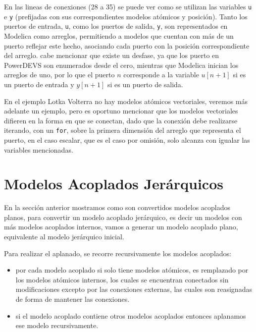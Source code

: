         En las lineas de conexiones (28 a 35) se puede ver como se utilizan las variables \texttt{u} e \texttt{y} (prefijadas con sus correspondientes modelos
        atómicos y posición). Tanto los puertos de entrada, \texttt{u}, como los puertos de salida, \texttt{y}, son representados en Modelica como arreglos,
        permitiendo a modelos que cuentan con más de un puerto reflejar este hecho, asociando cada puerto con la posición correspondiente del arreglo. 
        cabe mencionar que existe un desfase, ya que los puerto en PowerDEVS son enumerados desde el cero, mientras que Modelica inician los arreglos de uno, por lo
        que el puerto $n$ corresponde a la variable $u[n+1]$ si es un puerto de entrada y $y[n+1]$ si es un puerto de salida.

        En el ejemplo Lotka Volterra no hay modelos atómicos vectoriales, veremos más adelante un ejemplo, pero es oportuno mencionar que los modelos
        vectoriales difieren en la forma en que se conectan, dado que la conexión debe realizarse iterando, con un \texttt{for}, sobre la primera dimensión del 
        arreglo que representa el puerto, en el caso escalar, que es el caso por omisión, solo alcanza con igualar las variables mencionadas.


\section{Modelos Acoplados Jerárquicos} \label{aplanado}
        En la sección anterior mostramos como son convertidos modelos acoplados planos, para convertir un modelo acoplado jerárquico, es decir un modelos con más 
        modelos acoplados internos, vamos a generar un modelo acoplado plano, equivalente al modelo jerárquico inicial.

        Para realizar el aplanado, se recorre recursivamente los modelos acoplados:

        \begin{itemize}
                \item por cada modelo acoplado si solo tiene modelos atómicos, es remplazado por los modelos atómicos internos, los cuales se encuentran conectados 
                        sin modificaciones excepto por las conexiones externas, las cuales son reasignadas de forma de mantener las conexiones.
                \item si el modelo acoplado contiene otros modelos acoplados entonces aplanamos ese modelo recursivamente.
        \end{itemize} 

